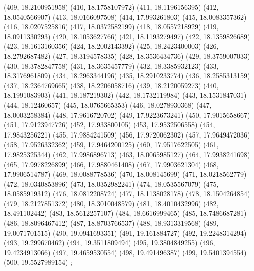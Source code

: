 {					(409, 18.2100951958)
					(410, 18.1758107972)
					(411, 18.1196156395)
					(412, 18.0540566907)
					(413, 18.0166097508)
					(414, 17.993261803)
					(415, 18.0083357362)
					(416, 18.0207525816)
					(417, 18.0372582199)
					(418, 18.0557218929)
					(419, 18.0911330293)
					(420, 18.1053627766)
					(421, 18.1193279497)
					(422, 18.1359826689)
					(423, 18.1613160356)
					(424, 18.2002143392)
					(425, 18.2423400003)
					(426, 18.2792687482)
					(427, 18.3194578335)
					(428, 18.3536434736)
					(429, 18.3759007033)
					(430, 18.3782847758)
					(431, 18.3635457779)
					(432, 18.3385932123)
					(433, 18.3176961809)
					(434, 18.2963344196)
					(435, 18.2910233774)
					(436, 18.2585313159)
					(437, 18.2364769665)
					(438, 18.2206058716)
					(439, 18.2120059273)
					(440, 18.1991083903)
					(441, 18.187219302)
					(442, 18.1732119984)
					(443, 18.1531847031)
					(444, 18.12460657)
					(445, 18.0765665353)
					(446, 18.0278930368)
					(447, 18.0003258384)
					(448, 17.9616720702)
					(449, 17.9223673241)
					(450, 17.9015658667)
					(451, 17.9123947726)
					(452, 17.933800105)
					(453, 17.9532506558)
					(454, 17.9843256221)
					(455, 17.9884241509)
					(456, 17.9720062302)
					(457, 17.9649472036)
					(458, 17.9526332362)
					(459, 17.9464200125)
					(460, 17.9517622505)
					(461, 17.9825325344)
					(462, 17.9986896713)
					(463, 18.0065985127)
					(464, 17.9938241698)
					(465, 17.9978226899)
					(466, 17.9880461408)
					(467, 17.9903621304)
					(468, 17.9906514787)
					(469, 18.0088778536)
					(470, 18.008145699)
					(471, 18.0218562779)
					(472, 18.0340853896)
					(473, 18.0352982241)
					(474, 18.0535567079)
					(475, 18.0585919312)
					(476, 18.0812208724)
					(477, 18.1138028178)
					(478, 18.1504264854)
					(479, 18.2127851372)
					(480, 18.3010048579)
					(481, 18.4010432996)
					(482, 18.491102442)
					(483, 18.5612257107)
					(484, 18.6616999465)
					(485, 18.7486687281)
					(486, 18.8096467412)
					(487, 18.8703766537)
					(488, 18.9313319568)
					(489, 19.0071701515)
					(490, 19.0941693351)
					(491, 19.161884727)
					(492, 19.2248314294)
					(493, 19.299670462)
					(494, 19.3511809494)
					(495, 19.3804849255)
					(496, 19.4234913066)
					(497, 19.4659530554)
					(498, 19.491496387)
					(499, 19.5401394554)
					(500, 19.5527989154)
				};

